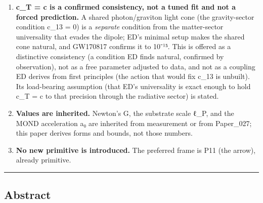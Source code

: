 \documentclass[
]{article}
\begin{document}
\begin{enumerate}
  canonical source is Paper\_087. The one piece of the map that is
  \emph{verified} (the gradient sector → spatial curvature) is marked as
  such.
\item
  \textbf{c\_T = c is a confirmed consistency, not a tuned fit and not a
  forced prediction.} A shared photon/graviton light cone (the
  gravity-sector condition c\_13 = 0) is a \emph{separate} condition
  from the matter-sector universality that evades the dipole; ED's
  minimal setup makes the shared cone natural, and GW170817 confirms it
  to 10⁻¹⁵. This is offered as a distinctive consistency (a condition ED
  finds natural, confirmed by observation), not as a free parameter
  adjusted to data, and not as a coupling ED derives from first
  principles (the action that would fix c\_13 is unbuilt). Its
  load-bearing assumption (that ED's universality is exact enough to
  hold c\_T = c to that precision through the radiative sector) is
  stated.
\item
  \textbf{Values are inherited.} Newton's G, the substrate scale ℓ\_P,
  and the MOND acceleration a₀ are inherited from measurement or from
  Paper\_027; this paper derives forms and bounds, not those numbers.
\item
  \textbf{No new primitive is introduced.} The preferred frame is P11
  (the arrow), already primitive.
\end{enumerate}

\begin{center}\rule{0.5\linewidth}{0.5pt}\end{center}

\subsection{Abstract}\label{abstract}
\end{document}
